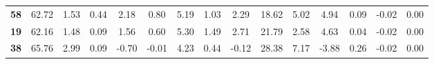 \documentclass[withoutpreface,bwprint]{cumcmthesis} %
\begin{document}
\begin{appendices}
\begin{table}[!h]
\begin{tabular}{@{}ccccccccccccccc@{}}
			\textbf{58}      & 62.72                                                          & 1.53                                                          & 0.44                                                         & 2.18                                                         & 0.80                                                         & 5.19                                                           & 1.03                                                           & 2.29                                                         & 18.62                                                        & 5.02                                                         & 4.94                                                            & 0.09                                                         & -0.02                                                         & 0.00                                                          \\
			\textbf{19}      & 62.16                                                          & 1.48                                                          & 0.09                                                         & 1.56                                                         & 0.60                                                         & 5.30                                                           & 1.49                                                           & 2.71                                                         & 21.79                                                        & 2.58                                                         & 4.63                                                            & 0.04                                                         & -0.02                                                         & 0.00                                                          \\
			\textbf{38}      & 65.76                                                          & 2.99                                                          & 0.09                                                         & -0.70                                                        & -0.01                                                        & 4.23                                                           & 0.44                                                           & -0.12                                                        & 28.38                                                        & 7.17                                                         & -3.88                                                           & 0.26                                                         & -0.02                                                         & 0.00                                                          \\

\end{tabular}
\end{table}
\end{appendices}
\end{document}
